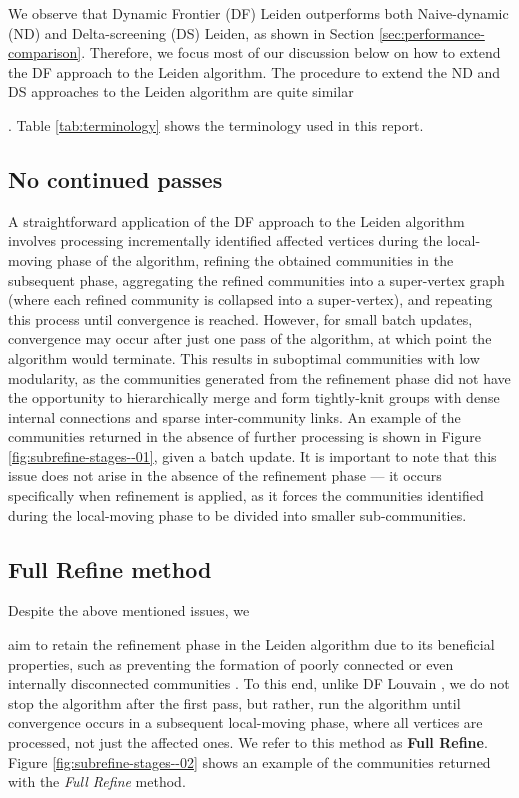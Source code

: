 We observe that Dynamic Frontier (DF) Leiden outperforms both Naive-dynamic (ND) and Delta-screening (DS) Leiden, as shown in Section \ref{sec:performance-comparison}. Therefore, we focus most of our discussion below on how to extend the DF approach to the Leiden algorithm. The procedure to extend the ND and DS approaches to the Leiden algorithm are quite similar. Table \ref{tab:terminology} shows the terminology used in this report.




\subsection{No continued passes}
\label{sec:no-continued-passes}

A straightforward application of the DF approach to the Leiden algorithm involves processing incrementally identified affected vertices during the local-moving phase of the algorithm, refining the obtained communities in the subsequent phase, aggregating the refined communities into a super-vertex graph (where each refined community is collapsed into a super-vertex), and repeating this process until convergence is reached. However, for small batch updates, convergence may occur after just one pass of the algorithm, at which point the algorithm would terminate. This results in suboptimal communities with low modularity, as the communities generated from the refinement phase did not have the opportunity to hierarchically merge and form tightly-knit groups with dense internal connections and sparse inter-community links. An example of the communities returned in the absence of further processing is shown in Figure \ref{fig:subrefine-stages--01}, given a batch update. It is important to note that this issue does not arise in the absence of the refinement phase --- it occurs specifically when refinement is applied, as it forces the communities identified during the local-moving phase to be divided into smaller sub-communities. 






\subsection{Full Refine method}
\label{sec:full-refine-method}

Despite the above mentioned issues, we aim to retain the refinement phase in the Leiden algorithm due to its beneficial properties, such as preventing the formation of poorly connected or even internally disconnected communities \cite{com-traag19}. To this end, unlike DF Louvain \cite{sahu2024shared}, we do not stop the algorithm after the first pass, but rather, run the algorithm until convergence occurs in a subsequent local-moving phase, where all vertices are processed, not just the affected ones. We refer to this method as \textbf{Full Refine}. Figure \ref{fig:subrefine-stages--02} shows an example of the communities returned with the \textit{Full Refine} method.




